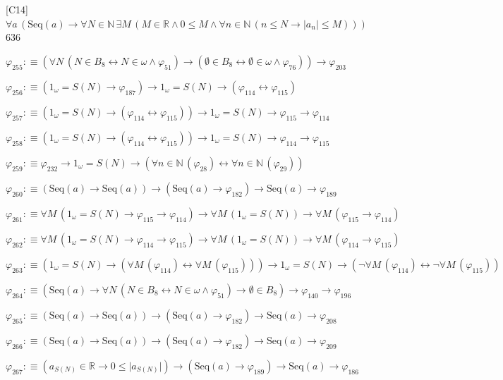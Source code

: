 \begin{fullproof}{[C14]}{$\forall a\,(\mathrm{Seq}(a) \to \forall N \in \mathbb{N}\,\exists M\,(M \in \mathbb{R} \land 0 \leq M \land \forall n \in \mathbb{N}\,(n \leq N \to \lvert a_{n} \rvert \leq M)))$}{636}
\begin{abbrevlist}
\item $\varphi_{255} :\equiv (\forall N\,(N \in B_{8} \leftrightarrow N \in \omega \land \varphi_{51}) \to (\emptyset \in B_{8} \leftrightarrow \emptyset \in \omega \land \varphi_{76})) \to \varphi_{203}$
\item $\varphi_{256} :\equiv (1_{\omega} = S(N) \to \varphi_{187}) \to 1_{\omega} = S(N) \to (\varphi_{114} \leftrightarrow \varphi_{115})$
\item $\varphi_{257} :\equiv (1_{\omega} = S(N) \to (\varphi_{114} \leftrightarrow \varphi_{115})) \to 1_{\omega} = S(N) \to \varphi_{115} \to \varphi_{114}$
\item $\varphi_{258} :\equiv (1_{\omega} = S(N) \to (\varphi_{114} \leftrightarrow \varphi_{115})) \to 1_{\omega} = S(N) \to \varphi_{114} \to \varphi_{115}$
\item $\varphi_{259} :\equiv \varphi_{232} \to 1_{\omega} = S(N) \to (\forall n \in \mathbb{N}\,(\varphi_{28}) \leftrightarrow \forall n \in \mathbb{N}\,(\varphi_{29}))$
\item $\varphi_{260} :\equiv (\mathrm{Seq}(a) \to \mathrm{Seq}(a)) \to (\mathrm{Seq}(a) \to \varphi_{182}) \to \mathrm{Seq}(a) \to \varphi_{189}$
\item $\varphi_{261} :\equiv \forall M\,(1_{\omega} = S(N) \to \varphi_{115} \to \varphi_{114}) \to \forall M\,(1_{\omega} = S(N)) \to \forall M\,(\varphi_{115} \to \varphi_{114})$
\item $\varphi_{262} :\equiv \forall M\,(1_{\omega} = S(N) \to \varphi_{114} \to \varphi_{115}) \to \forall M\,(1_{\omega} = S(N)) \to \forall M\,(\varphi_{114} \to \varphi_{115})$
\item $\varphi_{263} :\equiv (1_{\omega} = S(N) \to (\forall M\,(\varphi_{114}) \leftrightarrow \forall M\,(\varphi_{115}))) \to 1_{\omega} = S(N) \to (\neg \forall M\,(\varphi_{114}) \leftrightarrow \neg \forall M\,(\varphi_{115}))$
\item $\varphi_{264} :\equiv (\mathrm{Seq}(a) \to \forall N\,(N \in B_{8} \leftrightarrow N \in \omega \land \varphi_{51}) \to \emptyset \in B_{8}) \to \varphi_{140} \to \varphi_{196}$
\item $\varphi_{265} :\equiv (\mathrm{Seq}(a) \to \mathrm{Seq}(a)) \to (\mathrm{Seq}(a) \to \varphi_{182}) \to \mathrm{Seq}(a) \to \varphi_{208}$
\item $\varphi_{266} :\equiv (\mathrm{Seq}(a) \to \mathrm{Seq}(a)) \to (\mathrm{Seq}(a) \to \varphi_{182}) \to \mathrm{Seq}(a) \to \varphi_{209}$
\item $\varphi_{267} :\equiv (a_{S(N)} \in \mathbb{R} \to 0 \leq \lvert a_{S(N)} \rvert) \to (\mathrm{Seq}(a) \to \varphi_{189}) \to \mathrm{Seq}(a) \to \varphi_{186}$

\end{abbrevlist}
\end{fullproof}
